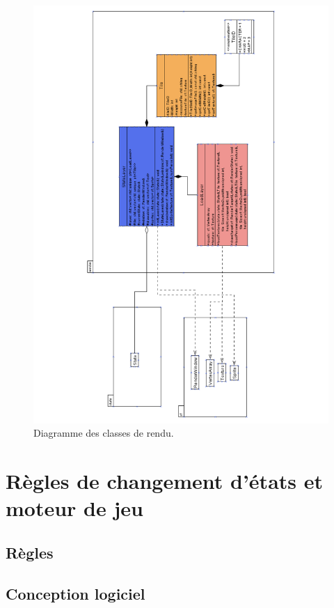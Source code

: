 \documentclass[a4paper,12pt]{article}
\begin{document}
\begin{landscape}
\begin{figure}[p]
\includegraphics[width=0.8\paperwidth,angle=270]{render.pdf}
\caption{\label{uml:render}Diagramme des classes de rendu.} 
\end{figure}
\end{landscape}

\clearpage
\section{Règles de changement d'états et moteur de jeu}

\subsection{Règles}

\clearpage
\subsection{Conception logiciel}
\end{document}

